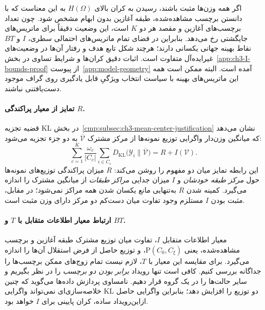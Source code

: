 اگر همه وزن‌ها مثبت باشند، رسیدن به کران بالای $H(\Omega)$ به این معناست که با دانستن برچسب مشاهده‌شده، طبقه آغازین بدون ابهام مشخص شود. چون تعداد برچسب‌های آغازین و مقصد هر دو $K$ است، این وضعیت دقیقاً برای ماتریس‌های جایگشتی رخ می‌دهد. بنابراین در فضای تمام ماتریس‌های احتمالی سطری، $I$ و $BT$ نقاط بهینه جهانی یکسانی دارند؛ هرچند شکل تابع هدف و رفتار آن‌ها در وضعیت‌های غیرایده‌آل متفاوت است. اثبات دقیق کران‌ها و شرایط تساوی در بخش~\ref{app:ch3-I-bounds-proof} از پیوست~\ref{app:model-geometry} آمده است. البته ممکن است همه این ماتریس‌های بهینه با سیاست انتخاب ویژگیِ قابل یادگیری روی گراف موجود دست‌یافتنی نباشند.

\paragraph{تمایز از معیار پراکندگی $R$.}
قضیه تجزیه KL در بخش~\ref{cmp:subsec:ch3-mean-center-justification} نشان می‌دهد که میانگین وزن‌دار واگرایی توزیع نمونه‌ها از مرکز مشترک $\overline{\mathcal V}$ به دو جزء تجزیه می‌شود:
\begin{equation}\label{cmp:eq:ch3-R-I-decomposition}
\boxed{
\sum_{c=1}^{K}\frac{\omega_c}{|C_c|}
\sum_{i\in C_c}
D_{\mathrm{KL}}\bigl(\mathscr Y_i\|\overline{\mathcal V}\bigr)
=R+I(\mathcal V).
}
\end{equation}
این رابطه تمایز میان دو مفهوم را روشن می‌کند: $R$ میزان پراکندگی توزیع‌های نمونه‌ها حول \emph{مرکز طبقه خودشان} و $I$ میزان جدایی \emph{مراکز طبقات} از میانگین مشترک را اندازه می‌گیرد. کمینه شدن $R$ به‌تنهایی مانع یکسان شدن همه مراکز نمی‌شود؛ در مقابل، مثبت بودن $I$ مستلزم وجود تفاوت میان دست‌کم دو مرکز دارای وزن مثبت است.

\paragraph{ارتباط معیار اطلاعات متقابل با $T$ و $BT$.}
معیار اطلاعات متقابل $I$، تفاوت میان توزیع مشترک طبقه آغازین و برچسب مشاهده‌شده، یعنی $\mathrm P(C_0,C_\xi)$، و توزیع حاصل از فرض استقلال آن‌ها را اندازه می‌گیرد. برای مقایسه این معیار با $T$، لازم نیست تمام زوج‌های ممکن برچسب‌ها را جداگانه بررسی کنیم. کافی است تنها رویداد \emph{برابر بودن دو برچسب} را در نظر بگیریم و سایر حالت‌ها را در یک گروه قرار دهیم. نامساوی پردازش داده‌ها می‌گوید که چنین خلاصه‌سازی‌ای نمی‌تواند واگرایی KL دو توزیع را افزایش دهد؛ بنابراین واگرایی حاصل ازاین‌رویداد ساده، کران پایینی برای $I$ خواهد بود.

